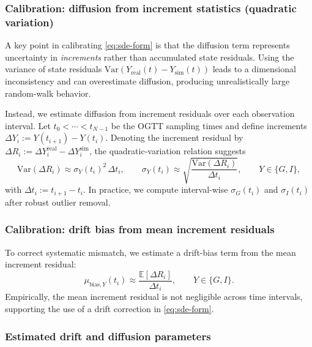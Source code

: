 \subsubsection{Calibration: diffusion from increment statistics (quadratic variation)}
\label{subsubsec:sde-diffusion}

A key point in calibrating \eqref{eq:sde-form} is that the diffusion term represents uncertainty in \emph{increments} rather than accumulated state residuals.
Using the variance of state residuals $\mathrm{Var}(Y_{\mathrm{real}}(t)-Y_{\mathrm{sim}}(t))$ leads to a dimensional inconsistency and can
overestimate diffusion, producing unrealistically large random-walk behavior.

Instead, we estimate diffusion from increment residuals over each observation interval.
Let $t_0<\cdots<t_{N-1}$ be the OGTT sampling times and define increments $\Delta Y_i := Y(t_{i+1})-Y(t_i)$.
Denoting the increment residual by $\Delta R_i := \Delta Y^{\mathrm{real}}_i - \Delta Y^{\mathrm{sim}}_i$,
the quadratic-variation relation suggests
\begin{equation}
\label{eq:diffusion-increment}
\mathrm{Var}(\Delta R_i)\approx \sigma_Y(t_i)^2\,\Delta t_i,
\qquad
\sigma_Y(t_i) \approx \sqrt{\frac{\mathrm{Var}(\Delta R_i)}{\Delta t_i}},
\qquad Y\in\{G,I\},
\end{equation}
with $\Delta t_i:=t_{i+1}-t_i$.
In practice, we compute interval-wise $\sigma_G(t_i)$ and $\sigma_I(t_i)$ after robust outlier removal.

\subsubsection{Calibration: drift bias from mean increment residuals}
\label{subsubsec:sde-bias}

To correct systematic mismatch, we estimate a drift-bias term from the mean increment residual:
\begin{equation}
\label{eq:drift-bias}
\mu_{\mathrm{bias},Y}(t_i) \approx \frac{\mathbb{E}[\Delta R_i]}{\Delta t_i},
\qquad Y\in\{G,I\}.
\end{equation}
Empirically, the mean increment residual is not negligible across time intervals, supporting the use of a drift correction in \eqref{eq:sde-form}.

\subsubsection{Estimated drift and diffusion parameters}
\label{subsubsec:sde-estimates}

